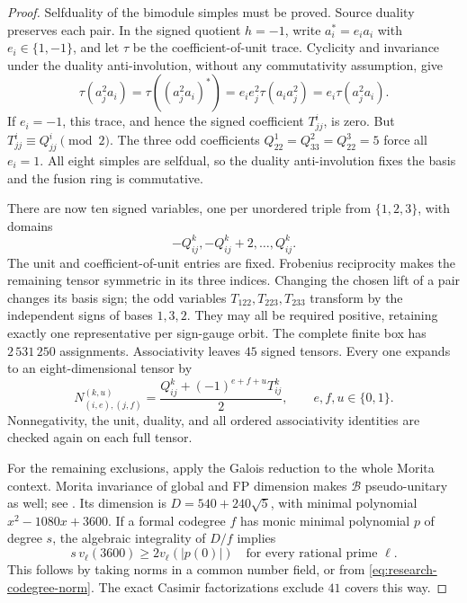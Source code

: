 \begin{proof}
Selfduality of the bimodule simples must be proved.  Source duality
preserves each pair.  In the signed quotient $h=-1$, write
$a_i^*=e_i a_i$ with $e_i\in\{1,-1\}$, and let $\tau$ be the
coefficient-of-unit trace.  Cyclicity and invariance under the duality
anti-involution, without any commutativity assumption, give
\[
 \tau(a_j^2a_i)=\tau((a_j^2a_i)^*)
 =e_i e_j^2\tau(a_i a_j^2)=e_i\tau(a_j^2a_i).
\]
If $e_i=-1$, this trace, and hence the signed coefficient $T_{jj}^i$,
is zero.  But $T_{jj}^i\equiv Q_{jj}^i\pmod2$.  The three odd
coefficients $Q_{22}^1=Q_{33}^2=Q_{22}^3=5$ force all $e_i=1$.
All eight simples are selfdual, so the duality anti-involution fixes
the basis and the fusion ring is commutative.

There are now ten signed variables, one per unordered triple from
$\{1,2,3\}$, with domains
\[
 -Q_{ij}^k,-Q_{ij}^k+2,\ldots,Q_{ij}^k.
\]
The unit and coefficient-of-unit entries are fixed.  Frobenius
reciprocity makes the remaining tensor symmetric in its three indices.
Changing the chosen lift of a pair changes its basis sign; the odd
variables $T_{122},T_{223},T_{233}$ transform by the independent
signs of bases $1,3,2$.  They may all be required positive, retaining
exactly one representative per sign-gauge orbit.  The complete finite
box has $2\,531\,250$ assignments.  Associativity leaves $45$ signed
tensors.  Every one expands to an eight-dimensional tensor by
\begin{equation}\label{eq:pointed-cover-reconstruction}
 N_{(i,e),(j,f)}^{(k,u)}
 =\frac{Q_{ij}^k+(-1)^{e+f+u}T_{ij}^k}{2},
 \qquad e,f,u\in\{0,1\}.
\end{equation}
Nonnegativity, the unit, duality, and all ordered associativity
identities are checked again on each full tensor.

For the remaining exclusions, apply the Galois reduction to the whole
Morita context.  Morita invariance of global and FP dimension makes
$\mathcal B$ pseudo-unitary as well; see
\cite[Theorem~2.15 and Corollary~8.14]{ENO}.
Its dimension is $D=540+240\sqrt5$, with minimal polynomial
$x^2-1080x+3600$.  If a formal codegree $f$ has monic minimal polynomial
$p$ of degree $s$, the algebraic integrality of $D/f$ implies
\[
 s\,v_\ell(3600)\geq2v_\ell(|p(0)|)
 \quad\text{for every rational prime }\ell.
\]
This follows by taking norms in a common number field, or from
\eqref{eq:research-codegree-norm}.  The exact Casimir factorizations
exclude $41$ covers this way.


\end{proof}
